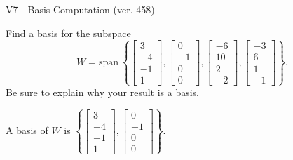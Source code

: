 \begin{exercise}
  \begin{exerciseTitle}V7 - Basis Computation (ver. 458)\end{exerciseTitle}
  \begin{exerciseStatement}
    Find a basis for the subspace 
\[W=\mathrm{span}\ \left\{\left[\begin{array}{r}
3 \\
-4 \\
-1 \\
1
\end{array}\right] , \left[\begin{array}{r}
0 \\
-1 \\
0 \\
0
\end{array}\right] , \left[\begin{array}{r}
-6 \\
10 \\
2 \\
-2
\end{array}\right] , \left[\begin{array}{r}
-3 \\
6 \\
1 \\
-1
\end{array}\right]\right\}.\]
 Be sure to explain why your result is a basis.


  \end{exerciseStatement}
  \begin{exerciseAnswer}
   A basis of \(W\) is  \(\left\{\left[\begin{array}{r}
3 \\
-4 \\
-1 \\
1
\end{array}\right] , \left[\begin{array}{r}
0 \\
-1 \\
0 \\
0
\end{array}\right]\right\}\).
  


  \end{exerciseAnswer}
\end{exercise}